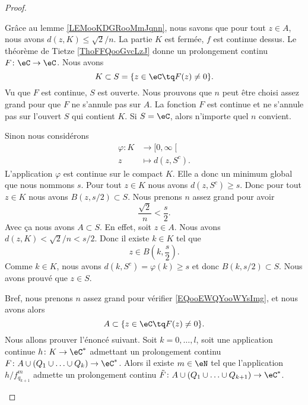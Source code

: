 \begin{proof}
\begin{subproof}
		Grâce au lemme \ref{LEMooKDGRooMmJqnn}, nous savons que pour tout \( z\in A\), nous avons \( d(z,K)\leq \sqrt{ 2 }/n\).
		\spitem[Prolongement]
		La partie \( K\) est fermée, \( f\) est continue dessus. Le théorème de Tietze \ref{ThoFFQooGvcLzJ} donne un prolongement continu \( F\colon \eC\to \eC\). Nous avons
		\begin{equation}
			K\subset S=\{ z\in \eC\tq F(z)\neq 0 \}.
		\end{equation}
		Vu que \( F\) est continue, \( S\) est ouverte.
		\spitem[Grand \( n\)]
		Nous prouvons que \( n\) peut être choisi assez grand pour que \( F\) ne s'annule pas sur \( A\). La fonction \( F\) est continue et ne s'annule pas sur l'ouvert \( S\) qui contient \( K\). Si \( S=\eC\), alors n'importe quel \( n\) convient.

		Sinon nous considérons
		\begin{equation}
			\begin{aligned}
				\varphi\colon K & \to \mathopen[ 0 , \infty \mathclose[ \\
				z               & \mapsto d(z,S^c).
			\end{aligned}
		\end{equation}
		L'application \( \varphi\) est continue sur le compact \( K\). Elle a donc un minimum global que nous nommons \( s\). Pour tout \( z\in K\) nous avons \( d(z,S^c)\geq s\). Donc pour tout \( z\in K\) nous avons \( B(z,s/2)\subset S\). Nous prenons \( n\) assez grand pour avoir
		\begin{equation}        \label{EQooEWQYooWYsImg}
			\frac{ \sqrt{ 2 } }{ n }<\frac{ s }{ 2 }.
		\end{equation}
		Avec ça nous avons \( A\subset S\). En effet, soit \( z\in A\). Nous avons \( d(z,K)<\sqrt{ 2 }/n<s/2\). Donc il existe \( k\in K\) tel que
		\begin{equation}
			z\in B(k,\frac{ s }{2}).
		\end{equation}
		Comme \( k\in K\), nous avons \( d(k,S^c)=\varphi(k)\geq s\) et donc \( B(k,s/2)\subset S\). Nous avons prouvé que \( z\in S\).

		Bref, nous prenons \( n\) assez grand pour vérifier \eqref{EQooEWQYooWYsImg}, et nous avons alors
		\begin{equation}
			A\subset \{ z\in \eC\tq F(z)\neq 0 \}.
		\end{equation}
				\label{SPooVQHTooUNukEE}
		Nous allons prouver l'énoncé suivant. Soit \( k=0,\ldots, l\), soit une application continue \( h\colon K\to \eC^*\) admettant un prolongement continu \( F\colon A\cup(Q_1\cup\ldots\cup Q_k)\to \eC^*\). Alors il existe \( m\in \eN\) tel que l'application \( h/f_{q_{k+1}}^m\) admette un prolongement continu \( \tilde F\colon A\cup(Q_1\cup\ldots\cup Q_{k+1})\to \eC^*\).


\end{subproof}
\end{proof}
